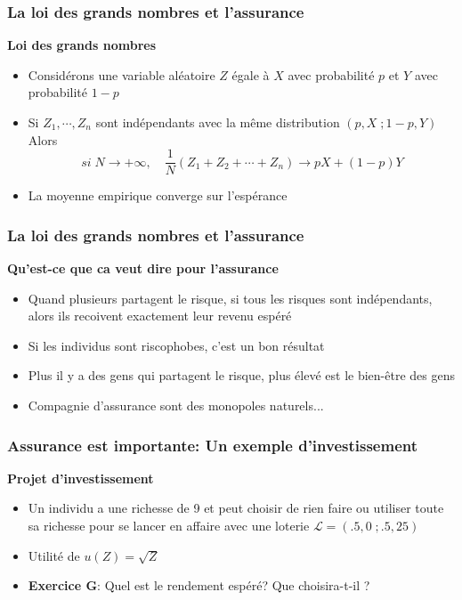 \documentclass[handout]{beamer}
\newenvironment{iPar}[1]{\textbf{#1} \begin{itemize}}{\end{itemize}}
\newcommand{\mc}{\mathcal}
\begin{document}
\begin{frame} \frametitle{La loi des grands nombres et l'assurance}

\begin{iPar}{Loi des grands nombres} \item Considérons une variable aléatoire $Z$
égale à  $X$ avec probabilité $p$ et $Y$ avec probabilité $1-p$ \item Si $Z_1,
\cdots , Z_n$ sont indépendants avec la même distribution $(p,X \;; 1-p,Y)$
Alors $$si\; N \to +\infty,\quad  \frac{1}{N} (Z_1 + Z_2 + \cdots + Z_n)
\to pX + (1-p)Y$$

\item La moyenne empirique converge sur l'espérance \end{iPar}
\end{frame}


\begin{frame} \frametitle{La loi des grands nombres et l'assurance}

\begin{iPar}{Qu'est-ce que ca veut dire pour l'assurance} \item Quand plusieurs partagent le risque, si tous les risques sont indépendants, alors ils recoivent exactement leur revenu espéré \item Si les individus sont riscophobes, c'est un bon résultat \item Plus il y a des gens qui partagent le risque, plus élevé est le bien-être des gens \item Compagnie d'assurance sont des monopoles naturels... \end{iPar}

\end{frame}

\begin{frame}\frametitle{Assurance est importante: Un exemple d'investissement}
\textbf{Projet d'investissement}\begin{itemize} \item Un individu a une richesse de
9 et peut choisir de rien faire ou utiliser toute sa richesse pour se lancer en affaire avec une loterie $\mc L = (.5,0 \;; .5,25)$ \item Utilité de $u(Z) = \sqrt{Z}$ \item \textbf{Exercice G}: Quel est le rendement espéré? Que choisira-t-il ? \end{itemize}\end{frame}
\end{document}
